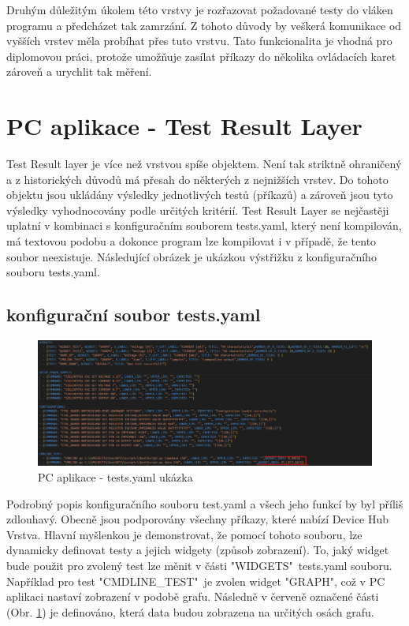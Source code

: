 Druhým důležitým úkolem této vrstvy je rozřazovat požadované testy do vláken programu a předcházet tak zamrzání.
Z tohoto důvody by veškerá komunikace od vyšších vrstev měla probíhat přes tuto vrstvu.
Tato funkcionalita je vhodná pro diplomovou práci, protože umožňuje zasílat příkazy do několika ovládacích karet zároveň a
urychlit tak měření.


\section{PC aplikace - Test Result Layer}
Test Result layer je více než vrstvou spíše objektem.
Není tak striktně ohraničený a z historických důvodů má přesah do některých z nejnižších vrstev.
Do tohoto objektu jsou ukládány výsledky jednotlivých testů (příkazů) a zároveň jsou tyto výsledky vyhodnocovány podle
určitých kritérií.
Test Result Layer se nejčastěji uplatní v kombinaci s konfiguračním souborem tests.yaml, který není kompilován, má textovou podobu
a dokonce program lze kompilovat i v případě, že tento soubor neexistuje.
Následující obrázek je ukázkou výstřižku z konfiguračního souboru tests.yaml.

\subsection{konfigurační soubor tests.yaml}

\begin{figure}[ht!]
    \centering
    \includegraphics[width = 1\textwidth]{obrazky/test_result_class.png}
    \caption{PC aplikace - tests.yaml ukázka}
    \label{fig: tests yaml}
\end{figure}

Podrobný popis konfiguračního souboru test.yaml a všech jeho funkcí by byl příliš zdlouhavý.
Obecně jsou podporovány všechny příkazy, které nabízí Device Hub Vrstva.
Hlavní myšlenkou je demonstrovat, že pomocí tohoto souboru, lze dynamicky definovat testy a jejich widgety (způsob zobrazení). 
To, jaký widget bude použit pro zvolený test lze měnit v části "WIDGETS"\ tests.yaml souboru. Například pro test "CMDLINE\_TEST"\ je zvolen
widget "GRAPH", což v PC aplikaci nastaví zobrazení v podobě grafu.
Následně v červeně označené části (Obr. \ref{fig: tests yaml}) je definováno, která data budou zobrazena na určitých osách grafu.\par


